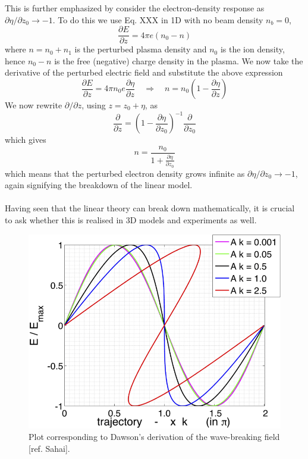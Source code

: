 This is further emphasized by consider the electron-density response as $\partial \eta/\partial z_0\to -1$. To do this we use  Eq. XXX in 1D with no beam density $n_b=0$, 
\begin{equation}
\frac{\partial E}{\partial z}=4\pi e(n_0-n)
\end{equation}
where $n=n_0+n_1$ is the perturbed plasma density and $n_0$ is the ion density, hence $n_0-n$ is the free (negative) charge density in the plasma. We now take the derivative of the perturbed electric field and substitute the above expression
\begin{equation}
\frac{\partial E}{\partial z}=4\pi n_0 e \frac{\partial \eta}{\partial z} \quad \Rightarrow \quad n=n_0\left(1-\frac{\partial \eta}{\partial z}\right)
\end{equation}
We now rewrite $\partial /\partial z$, using $z=z_0+\eta$, as
\begin{equation}
\frac{\partial}{\partial z}=\left(1-\frac{\partial \eta }{\partial z_0}\right)^{-1}\frac{\partial}{\partial z_0}
\end{equation}
which gives
\begin{equation}
n=\frac{n_0}{1+\frac{\partial \eta }{\partial z_0}}
 \end{equation} 
 which means that the perturbed electron density grows infinite as $\partial \eta/\partial z_0\to -1$, again signifying the breakdown of the linear model.\\
\\
Having seen that the linear theory can break down mathematically, it is crucial to ask whether this is realised in 3D models and experiments as well. 
\begin{figure}
\centering
\includegraphics[scale=1]{SahaiThesisPlot}
\caption{Plot corresponding to Dawson's derivation of the wave-breaking field [ref. Sahai].}
\label{DawsonCriterionPlot}
\end{figure}

